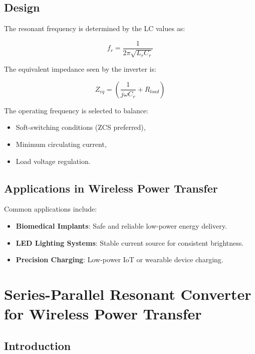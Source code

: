 \documentclass[12pt,a4paper]{report}
\begin{document}
\section{Design }

\quad The resonant frequency is determined by the LC values as:

\[
f_r = \frac{1}{2\pi \sqrt{L_r C_r}}
\]

\quad The equivalent impedance seen by the inverter is:

\[
Z_{eq} = \left( \frac{1}{j\omega C_r} + R_{load} \right)
\]

\quad The operating frequency is selected to balance:
\begin{itemize}
    \item Soft-switching conditions (ZCS preferred),
    \item Minimum circulating current,
    \item Load voltage regulation.\cite{choi2020resonant}
\end{itemize}

\section{Applications in Wireless Power Transfer}



Common applications include:

\begin{itemize}
    \item \textbf{Biomedical Implants}: Safe and reliable low-power energy delivery.
    \item \textbf{LED Lighting Systems}: Stable current source for consistent brightness.
    \item \textbf{Precision Charging}: Low-power IoT or wearable device charging.\cite{choi2020resonant}
\end{itemize}





 

\chapter{Series-Parallel Resonant Converter for Wireless Power Transfer}
\vspace{1cm}\section{Introduction}
\end{document}
